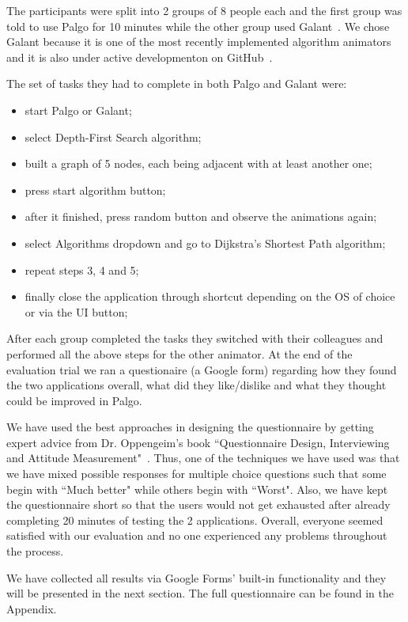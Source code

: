\documentclass{l4proj}
\begin{document}
The participants were split into 2 groups of 8 people each and the first group was told to use Palgo for 10 minutes while the
other group used Galant~\cite{galant}. We chose Galant because it is one of the most recently implemented algorithm
animators and it is also under active developmenton on GitHub~\cite{galant-github}.

The set of tasks they had to complete in both Palgo and Galant were:

\begin{itemize}
  \item start Palgo or Galant;
  \item select Depth-First Search algorithm;
  \item built a graph of 5 nodes, each being adjacent with at least another one;
  \item press start algorithm button;
  \item after it finished, press random button and observe the animations again;
  \item select Algorithms dropdown and go to Dijkstra's Shortest Path algorithm;
  \item repeat steps 3, 4 and 5;
  \item finally close the application through shortcut depending on the OS of choice or via the UI button;
\end{itemize}

After each group completed the tasks they switched with their colleagues and performed all the above steps for the other
animator. At the end of the evaluation trial we ran a questionaire (a Google form) regarding how
they found the two applications overall, what did they like/dislike and what they thought could be improved in
Palgo. 

We have used the best approaches in designing the questionnaire by getting expert advice from Dr. Oppengeim's book
``Questionnaire Design, Interviewing and Attitude Measurement"~\cite{questionnaire-design}. Thus, one of the techniques
we have used was that we have mixed possible
responses for multiple choice questions such that some begin with ``Much better" while others begin with ``Worst". Also, we have
kept the questionnaire short so that the users would not get exhausted after already completing 20 minutes of testing
the 2 applications. Overall, everyone seemed satisfied with our evaluation and no one experienced any problems throughout the process.

We have collected all results via Google Forms' built-in functionality and they will be presented in the next section.
The full questionnaire can be found in the Appendix.
\end{document}
